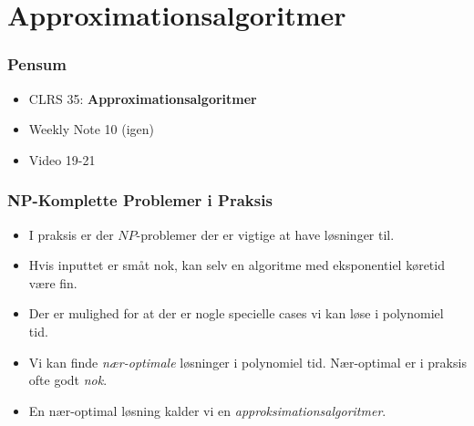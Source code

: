 \section{Approximationsalgoritmer}%
\label{sec:Approximationsalgoritmer}

\begin{frame}
  \frametitle{Pensum}
  \begin{itemize}
    \item CLRS 35: \textbf{Approximationsalgoritmer}
    \item Weekly Note 10 (igen)
    \item Video 19-21
  \end{itemize}
\end{frame}

\begin{frame}
  \frametitle{NP-Komplette Problemer i Praksis}
  \begin{itemize}
    \item I praksis er der $NP$-problemer der er vigtige at have løsninger til.
    \item Hvis inputtet er småt nok, kan selv en algoritme med eksponentiel køretid være fin.
    \item Der er mulighed for at der er nogle specielle cases vi kan løse i polynomiel tid.
    \item Vi kan finde \textit{nær-optimale} løsninger i polynomiel tid. Nær-optimal er i praksis ofte godt \textit{nok}.
    \item En nær-optimal løsning kalder vi en \textit{approksimationsalgoritmer}.
  \end{itemize}
\end{frame}

